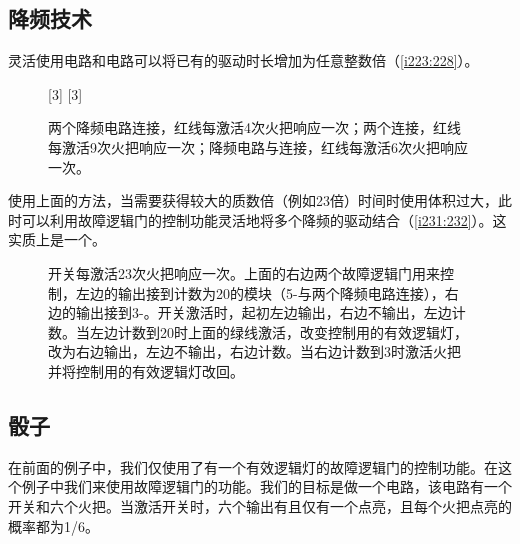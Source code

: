 \subsection{降频技术}\label{sec18}
灵活使用电路和电路可以将已有的驱动时长增加为任意整数倍（\autoref{i223:228}）。

\begin{figure}[!ht]
  \centering
  [3]%
  [3]%
  \caption{\protect{}两个降频电路连接，红线每激活4次火把响应一次；\protect{}两个\ShiftRegister 连接，红线每激活9次火把响应一次；\protect{}降频电路与\ShiftRegister 连接，红线每激活6次火把响应一次。}
  \label{i223:228}
\end{figure}

使用上面的方法，当需要获得较大的质数倍（例如23倍）时间时使用\ShiftRegister 体积过大，此时可以利用故障逻辑门的控制功能灵活地将多个降频的驱动结合（\autoref{i231:232}）。这实质上是一个\hyperref[sec5]{}。

\begin{figure}[!ht]
  \centering
  \caption{开关每激活23次火把响应一次。上面的右边两个故障逻辑门用来控制，左边的输出接到计数为20的模块（5-\ShiftRegister 与两个降频电路连接），右边的输出接到3-\ShiftRegister 。开关激活时，起初左边输出，右边不输出，左边计数。当左边计数到20时上面的绿线激活，改变控制用的有效逻辑灯，改为右边输出，左边不输出，右边计数。当右边计数到3时激活火把并将控制用的有效逻辑灯改回。}
  \label{i231:232}
\end{figure}

\subsection{骰子}

在前面的例子中，我们仅使用了有一个有效逻辑灯的故障逻辑门的控制功能。在这个例子中我们来使用故障逻辑门的功能。我们的目标是做一个电路，该电路有一个开关和六个火把。当激活开关时，六个输出有且仅有一个点亮，且每个火把点亮的概率都为1/6。

